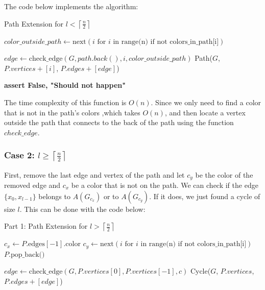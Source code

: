 The code below implements the algorithm:

\begin{algorithm}[H]
    \caption{Path Extension for \( l < \left \lceil \frac{n}{2} \right \rceil \)}
    \begin{algorithmic}[1]
        \State $color\_outside\_path \gets \text{next}(i \text{ for } i \text{ in range(n) if not colors\_in\_path[i]})$

                \State $edge \gets \text{check\_edge}(G, path.back(), i, color\_outside\_path)$
                    \State \Return Path($G$, $P.vertices + [i]$, $P.edges + [edge]$)
                \EndIf
            \EndIf
        \EndFor

        \State \textbf{assert False, "Should not happen"}
    \EndFunction
    \end{algorithmic}
\end{algorithm}

The time complexity of this function is \( O(n) \). Since we 
only need to find a color that is not in the path’s colors 
,which takes \( O(n) \), and then locate a vertex outside 
the path that connects to the back of the path using the 
function $check\_edge$.

\subsubsection{Case 2: \( l \geq \left \lceil \frac{n}{2} \right \rceil \)}

First, remove the last edge and
vertex of the path and let $c_y$ be the color of the removed edge and $c_x$ 
be a color that is not on the path.
We can check if the edge $\{x_0, x_{l-1}\}$ belongs to $A(G_{c_x})$ or
to $A(G_{c_y})$. If it does, we just found a cycle of size $l$. 
This can be done with the code below:

\begin{algorithm}[H]
    \caption{Part 1: Path Extension for \( l > \left \lceil \frac{n}{2} \right \rceil \)}
    \begin{algorithmic}
            \State $c_x \gets P.\text{edges}[-1].\text{color}$ 
            \State $c_y \gets \text{next}(i \text{ for } i \text{ in range(n) if not colors\_in\_path[i]})$
            \State $P.\text{pop\_back()}$ 

                \State $edge \gets \text{check\_edge}(G, P.vertices[0], P.vertices[-1], c)$
                    \State \Return Cycle($G$, $P.vertices$, $P.edges + [edge]$) 
                \EndIf
            \EndFor
        \EndFunction
    \end{algorithmic}
\end{algorithm}

